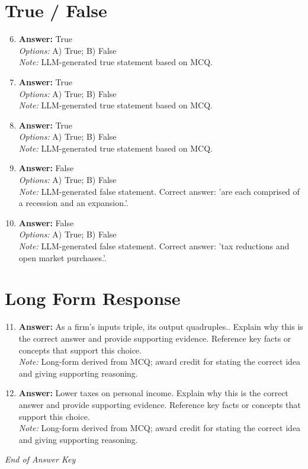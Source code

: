 \documentclass[12pt]{article}
\begin{document}
\section*{True / False}
\begin{enumerate}[label=\arabic*.]
\setcounter{enumi}{5}
\item \textbf{Answer:} True
\\ \textit{Options:} A) True; B) False
\\ \textit{Note:} LLM-generated true statement based on MCQ.
\item \textbf{Answer:} True
\\ \textit{Options:} A) True; B) False
\\ \textit{Note:} LLM-generated true statement based on MCQ.
\item \textbf{Answer:} True
\\ \textit{Options:} A) True; B) False
\\ \textit{Note:} LLM-generated true statement based on MCQ.
\item \textbf{Answer:} False
\\ \textit{Options:} A) True; B) False
\\ \textit{Note:} LLM-generated false statement. Correct answer: 'are each comprised of a recession and an expansion.'.
\item \textbf{Answer:} False
\\ \textit{Options:} A) True; B) False
\\ \textit{Note:} LLM-generated false statement. Correct answer: 'tax reductions and open market purchases.'.
\end{enumerate}

\section*{Long Form Response}
\begin{enumerate}[label=\arabic*.]
\setcounter{enumi}{10}
\item \textbf{Answer:} As a firm's inputs triple, its output quadruples.. Explain why this is the correct answer and provide supporting evidence. Reference key facts or concepts that support this choice.
\\ \textit{Note:} Long-form derived from MCQ; award credit for stating the correct idea and giving supporting reasoning.
\item \textbf{Answer:} Lower taxes on personal income. Explain why this is the correct answer and provide supporting evidence. Reference key facts or concepts that support this choice.
\\ \textit{Note:} Long-form derived from MCQ; award credit for stating the correct idea and giving supporting reasoning.
\end{enumerate}

\vfill
\noindent\textit{End of Answer Key}
\end{document}
